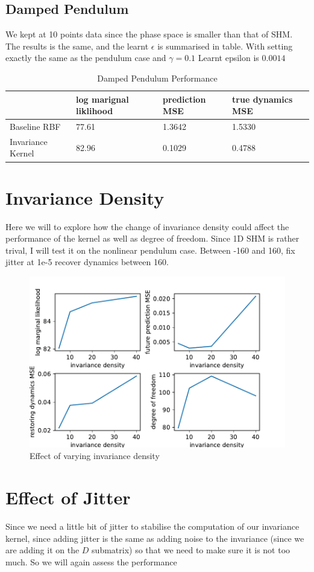 \documentclass{statsmsc}
\begin{document}
\subsection{Damped Pendulum}
We kept at 10 points data since the phase space is smaller than that of SHM. 
The results is the same, and the learnt $\epsilon$ is summarised in table. With setting exactly the same as the pendulum case and $\gamma=0.1$
Learnt epsilon is $0.0014$
\begin{table}[H]
  \centering
  \begin{tabular}{l l l l}
    \hline
                    & log marignal liklihood & prediction MSE & true dynamics MSE\\
    \hline
Baseline RBF & 77.61 & 1.3642 & 1.5330 \\
Invariance Kernel & 82.96 & 0.1029 & 0.4788 \\

    \hline
  \end{tabular}
  \caption{Damped Pendulum Performance }
  \label{tab:damped_pendulum_performance_within_range}
\end{table}

\section{Invariance Density}
Here we will to explore how the change of invariance density could affect the performance of the kernel as well as degree of freedom.
Since 1D SHM is rather trival, I will test it on the nonlinear pendulum case. 
Between -160 and 160, fix jitter at 1e-5
recover dynamics between 160.

\begin{figure}[H] 
  \includegraphics[width=0.6\linewidth]{../codes/figures/vary_invariance_density.pdf}
  \centering
  \caption{Effect of varying invariance density}
  \label{fig:vary_invariance_density}
\end{figure}

\section{Effect of Jitter}
Since we need a little bit of jitter to stabilise the computation of our invariance kernel, since adding jitter is the same as adding noise to the invariance (since we are adding it on the $D$ submatrix) so that we need to make sure it is not too much. So we will again assess the performance 
\end{document}
